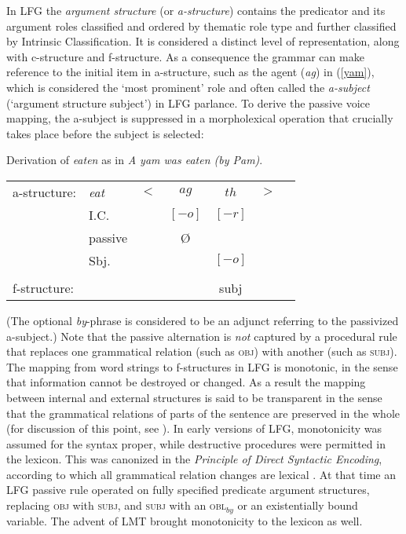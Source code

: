 In LFG the \textit{argument structure} (or \textit{a-structure}) contains the predicator and its argument roles classified and ordered by thematic role type and further classified by  Intrinsic Classification.  It is considered a distinct level of representation, along with c-structure and f-structure.  As a consequence the grammar can make reference to the initial item in a-structure, such as the agent (\textit{ag}) in (\ref{yam}), which is considered the `most prominent' role and often called the \textit{a-subject} (`argument structure subject') in LFG parlance.  To derive the passive voice mapping, the a-subject is suppressed in a morpholexical operation that crucially takes place before the subject is selected:  

 \begin{exe}
\ex\label{yam2}{Derivation of \textit{eaten} as in \textit{A yam was eaten (by Pam)}.\\
\begin{tabular}[t]{lllccll}
a-structure: &{\it eat}& $<$& $ag$ & $th$   & $>$ & \\
             & I.C.      &    & $[-o]$ & $[-r]$   &   & \\
             & passive      &    & \O  &    &   & \\
             &  Sbj.     &    &  &       $[-o]$     &              & \\
             &       &    &    & \vline &    & \\
f-structure: &       &    & &{\sc subj} &   &
\end{tabular}
  }
\end{exe}
(The optional \textit{by}-phrase is considered to be an adjunct referring to the passivized a-subject.)  Note that the passive alternation is \textit{not} captured by a procedural rule that replaces one grammatical relation (such as \textsc{obj}) with another (such as \textsc{subj}).   The mapping from word strings to f-structures in LFG is monotonic, in the sense that information cannot be destroyed or changed.  As a result the mapping between internal and external structures is said to be transparent in the sense that the grammatical relations of parts of the sentence are preserved in the whole (for discussion of this point, see \citet[chapter 5]{BATW2015a}).  In early versions of LFG, monotonicity was assumed for the syntax proper, while destructive procedures were permitted in the lexicon.  This was canonized in the \textit{Principle of Direct Syntactic Encoding}, according to which all grammatical relation changes are lexical \citep{Bresnan82a-ed}.  At that time an LFG passive rule operated on fully specified predicate argument structures, replacing \textsc{obj} with \textsc{subj}, and \textsc{subj} with an \textsc{obl$_{by}$} or an existentially bound variable.  The advent of LMT brought monotonicity to the lexicon as well.  


